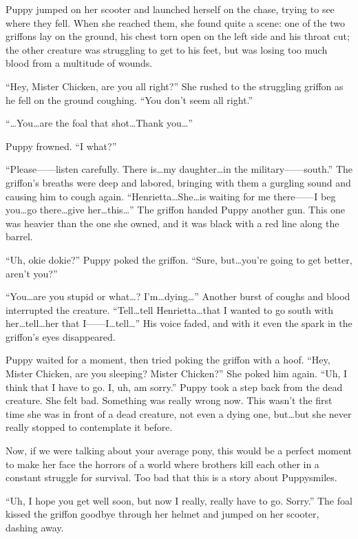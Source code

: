 Puppy jumped on her scooter and launched herself on the chase, trying to see where they fell. When she reached them, she found quite a scene: one of the two griffons lay on the ground, his chest torn open on the left side and his throat cut; the other creature was struggling to get to his feet, but was losing too much blood from a multitude of wounds.

``Hey, Mister Chicken, are you all right?'' She rushed to the struggling griffon as he fell on the ground coughing. ``You don't seem all right.''

``\dots You\dots are the foal that shot\dots Thank you\dots''

Puppy frowned. ``I what?''

``Please------listen carefully. There is\dots my daughter\dots in the military------south.'' The griffon's breaths were deep and labored, bringing with them a gurgling sound and causing him to cough again. ``Henrietta\dots She\dots is waiting for me there------I beg you\dots go there\dots give her\dots this\dots'' The griffon handed Puppy another gun. This one was heavier than the one she owned, and it was black with a red line along the barrel.

``Uh, okie dokie?'' Puppy poked the griffon. ``Sure, but\dots you're going to get better, aren't you?''

``You\dots are you stupid or what\dots? I'm\dots dying\dots'' Another burst of coughs and blood interrupted the creature. ``Tell\dots tell Henrietta\dots that I wanted to go south with her\dots tell\dots her that I------I\dots tell\dots'' His voice faded, and with it even the spark in the griffon's eyes disappeared.

Puppy waited for a moment, then tried poking the griffon with a hoof. ``Hey, Mister Chicken, are you sleeping? Mister Chicken?'' She poked him again. ``Uh, I think that I have to go. I, uh, am sorry.'' Puppy took a step back from the dead creature. She felt bad. Something was really wrong now. This wasn't the first time she was in front of a dead creature, not even a dying one, but\dots but she never really stopped to contemplate it before.

Now, if we were talking about your average pony, this would be a perfect moment to make her face the horrors of a world where brothers kill each other in a constant struggle for survival. Too bad that this is a story about Puppysmiles.

``Uh, I hope you get well soon, but now I really, really have to go. Sorry.'' The foal kissed the griffon goodbye through her helmet and jumped on her scooter, dashing away.

